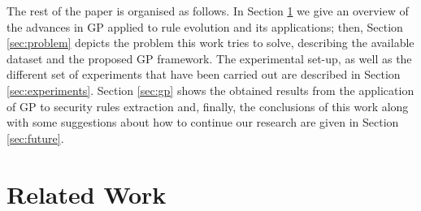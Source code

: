 \documentclass[a4paper,10pt,twocolumn,preprint,3p]{elsarticle}
\begin{document}
The rest of the paper is organised as follows. In Section \ref{sec:SotA} we give an overview of the advances in GP applied to rule evolution and its applications; then, Section \ref{sec:problem} depicts the problem this work tries to solve, describing the available dataset and the proposed GP framework. The experimental set-up, as well as the different set of experiments that have been carried out are described in Section \ref{sec:experiments}. Section \ref{sec:gp} shows the obtained results from the application of GP to security rules extraction and, finally, the conclusions of this work along with some suggestions about how to continue our research are given in Section \ref{sec:future}.  

\section{Related Work}
\label{sec:SotA}
\end{document}
